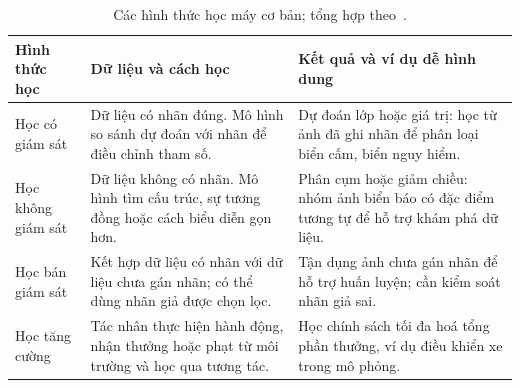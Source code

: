 \begin{table}[H]
\centering
\caption[Các hình thức học máy cơ bản]{Các hình thức học máy cơ bản; tổng hợp theo~\cite{google_intro_ml,google_ml_types}.}
\label{tab:hinhthuchoc}
\small
\begin{tabularx}{\textwidth}{|>{\raggedright\arraybackslash}p{2.5cm}|>{\raggedright\arraybackslash}X|>{\raggedright\arraybackslash}X|}
\toprule
\textbf{Hình thức học} & \textbf{Dữ liệu và cách học} & \textbf{Kết quả và ví dụ dễ hình dung} \\
\midrule
Học có giám sát & Dữ liệu có nhãn đúng. Mô hình so sánh dự đoán với nhãn để điều chỉnh tham số. & Dự đoán lớp hoặc giá trị: học từ ảnh đã ghi nhãn để phân loại biển cấm, biển nguy hiểm. \\ \hline
Học không giám sát & Dữ liệu không có nhãn. Mô hình tìm cấu trúc, sự tương đồng hoặc cách biểu diễn gọn hơn. & Phân cụm hoặc giảm chiều: nhóm ảnh biển báo có đặc điểm tương tự để hỗ trợ khám phá dữ liệu. \\ \hline
Học bán giám sát & Kết hợp dữ liệu có nhãn với dữ liệu chưa gán nhãn; có thể dùng nhãn giả được chọn lọc. & Tận dụng ảnh chưa gán nhãn để hỗ trợ huấn luyện; cần kiểm soát nhãn giả sai. \\ \hline
Học tăng cường & Tác nhân thực hiện hành động, nhận thưởng hoặc phạt từ môi trường và học qua tương tác. & Học chính sách tối đa hoá tổng phần thưởng, ví dụ điều khiển xe trong mô phỏng. \\
\bottomrule
\end{tabularx}
\end{table}
